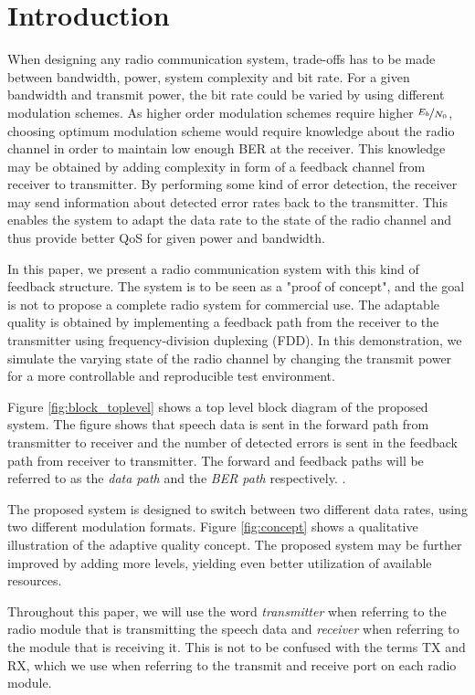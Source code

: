 \section{Introduction}
\label{sec:Introduction}
When designing any radio communication system, trade-offs has to be made between bandwidth, power, system complexity and bit rate. For a given bandwidth and transmit power, the bit rate could be varied by using different modulation schemes. As higher order modulation schemes require higher $\nicefrac{E_b}{N_0}$, choosing optimum modulation scheme would require knowledge about the radio channel in order to maintain low enough BER at the receiver. This knowledge may be obtained by adding complexity in form of a feedback channel from receiver to transmitter. By performing some kind of error detection, the receiver may send information about detected error rates back to the transmitter. This enables the system to adapt the data rate to the state of the radio channel and thus provide better QoS for given power and bandwidth. 

In this paper, we present a radio communication system with this kind of feedback structure. The system is to be seen as a "proof of concept", and the goal is not to propose a complete radio system for commercial use. The adaptable quality is obtained by implementing a feedback path from the receiver to the transmitter using frequency-division duplexing (FDD). In this demonstration, we simulate the varying state of the radio channel by changing the transmit power for a more controllable and reproducible test environment.

Figure \ref{fig:block_toplevel} shows a top level block diagram of the proposed system. The figure shows that speech data is sent in the forward path from transmitter to receiver and the number of detected errors is sent in the feedback path from receiver to transmitter. The forward and feedback paths will be referred to as the \textit{data path} and the \textit{BER path} respectively. 
. 

\newpage
The proposed system is designed to switch between two different data rates, using two different modulation formats. Figure \ref{fig:concept} shows a qualitative illustration of the adaptive quality concept. The proposed system may be further improved by adding more levels, yielding even better utilization of available resources. 



Throughout this paper, we will use the word \textit{transmitter} when referring to the radio module that is transmitting the speech data and \textit{receiver} when referring to the module that is receiving it. This is not to be confused with the terms TX and RX, which we use when referring to the transmit and receive port on each radio module. 

